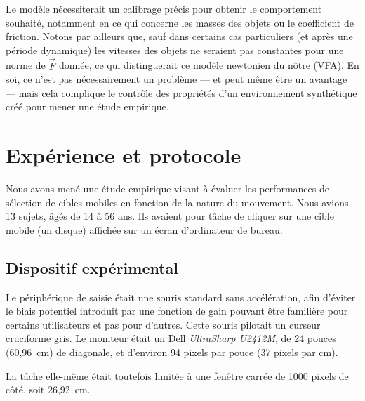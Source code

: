     
    Le modèle nécessiterait un calibrage précis pour obtenir le comportement souhaité, notamment en ce qui concerne les masses des objets ou le coefficient de friction. Notons par ailleurs que, sauf dans certains cas particuliers (et après une période dynamique) les vitesses des objets ne seraient pas constantes pour une norme de $\vec{F}$ donnée, ce qui distinguerait ce modèle newtonien du nôtre (VFA). En soi, ce n'est pas nécessairement un problème --- et peut même être un avantage --- mais cela complique le contrôle des propriétés d'un environnement synthétique créé pour mener une étude empirique.

\section{Expérience et protocole}
	Nous avons mené une étude empirique visant à évaluer les performances de sélection de cibles mobiles en fonction de la nature du mouvement. Nous avions 13 sujets, âgés de 14 à 56 ans. Ils avaient pour tâche de cliquer sur une cible mobile (un disque) affichée sur un écran d'ordinateur de bureau.

	\subsection{Dispositif expérimental}
	Le périphérique de saisie était une souris standard sans accélération, afin d'éviter le biais potentiel introduit par une fonction de gain pouvant être familière pour certains utilisateurs et pas pour d'autres. Cette souris pilotait un curseur cruciforme gris. Le moniteur était un Dell \emph{UltraSharp U2412M}\footnotemark{}, de 24 pouces (60,96~cm) de diagonale, et d'environ 94 pixels par pouce (37 pixels par cm).
	
	La tâche elle-même était toutefois limitée à une fenêtre carrée de 1000 pixels de côté, soit 26,92~cm.


